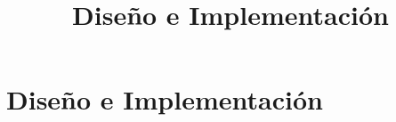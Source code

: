 \chapter{Diseño e Implementación}
\title{Diseño e Implementación}
\label{cap:DisenoEImplementacion}
